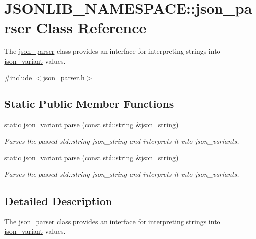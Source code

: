 \hypertarget{classJSONLIB__NAMESPACE_1_1json__parser}{}\section{J\+S\+O\+N\+L\+I\+B\+\_\+\+N\+A\+M\+E\+S\+P\+A\+CE\+:\+:json\+\_\+parser Class Reference}
\label{classJSONLIB__NAMESPACE_1_1json__parser}


The \hyperlink{classJSONLIB__NAMESPACE_1_1json__parser}{json\+\_\+parser} class provides an interface for interpreting strings into \hyperlink{classJSONLIB__NAMESPACE_1_1json__variant}{json\+\_\+variant} values.  




{\ttfamily \#include $<$json\+\_\+parser.\+h$>$}

\subsection*{Static Public Member Functions}
\begin{DoxyCompactItemize}
\item 
static \hyperlink{classJSONLIB__NAMESPACE_1_1json__variant}{json\+\_\+variant} \hyperlink{classJSONLIB__NAMESPACE_1_1json__parser_a8f097c29f98ed795a92b5941c9070f8b}{parse} (const std\+::string \&json\+\_\+string)
\begin{DoxyCompactList}\small\item\em Parses the passed std\+::string {\ttfamily json\+\_\+string} and interprets it into json\+\_\+variants. \end{DoxyCompactList}\item 
static \hyperlink{classJSONLIB__NAMESPACE_1_1json__variant}{json\+\_\+variant} \hyperlink{classJSONLIB__NAMESPACE_1_1json__parser_a92cc0ccf4fe28eea7a588d5bb7562510}{parse} (const std\+::string \&json\+\_\+string)
\begin{DoxyCompactList}\small\item\em Parses the passed std\+::string {\ttfamily json\+\_\+string} and interprets it into json\+\_\+variants. \end{DoxyCompactList}\end{DoxyCompactItemize}


\subsection{Detailed Description}
The \hyperlink{classJSONLIB__NAMESPACE_1_1json__parser}{json\+\_\+parser} class provides an interface for interpreting strings into \hyperlink{classJSONLIB__NAMESPACE_1_1json__variant}{json\+\_\+variant} values. 

